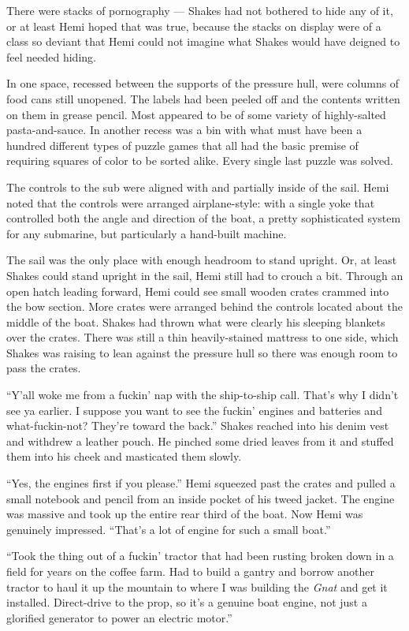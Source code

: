 \documentclass[
]{scrbook}
\begin{document}
There were stacks of pornography --- Shakes had not bothered to hide any
of it, or at least Hemi hoped that was true, because the stacks on
display were of a class so deviant that Hemi could not imagine what
Shakes would have deigned to feel needed hiding.

In one space, recessed between the supports of the pressure hull, were
columns of food cans still unopened. The labels had been peeled off and
the contents written on them in grease pencil. Most appeared to be of
some variety of highly-salted pasta-and-sauce. In another recess was a
bin with what must have been a hundred different types of puzzle games
that all had the basic premise of requiring squares of color to be
sorted alike. Every single last puzzle was solved.

The controls to the sub were aligned with and partially inside of the
sail. Hemi noted that the controls were arranged airplane-style: with a
single yoke that controlled both the angle and direction of the boat, a
pretty sophisticated system for any submarine, but particularly a
hand-built machine.

The sail was the only place with enough headroom to stand upright. Or,
at least Shakes could stand upright in the sail, Hemi still had to
crouch a bit. Through an open hatch leading forward, Hemi could see
small wooden crates crammed into the bow section. More crates were
arranged behind the controls located about the middle of the boat.
Shakes had thrown what were clearly his sleeping blankets over the
crates. There was still a thin heavily-stained mattress to one side,
which Shakes was raising to lean against the pressure hull so there was
enough room to pass the crates.

``Y'all woke me from a fuckin' nap with the ship-to-ship call. That's
why I didn't see ya earlier. I suppose you want to see the fuckin'
engines and batteries and what-fuckin-not? They're toward the back.''
Shakes reached into his denim vest and withdrew a leather pouch. He
pinched some dried leaves from it and stuffed them into his cheek and
masticated them slowly.

``Yes, the engines first if you please.'' Hemi squeezed past the crates
and pulled a small notebook and pencil from an inside pocket of his
tweed jacket. The engine was massive and took up the entire rear third
of the boat. Now Hemi was genuinely impressed. ``That's a lot of engine
for such a small boat.''

``Took the thing out of a fuckin' tractor that had been rusting broken
down in a field for years on the coffee farm. Had to build a gantry and
borrow another tractor to haul it up the mountain to where I was
building the \emph{Gnat} and get it installed. Direct-drive to the prop,
so it's a genuine boat engine, not just a glorified generator to power
an electric motor.''
\end{document}

